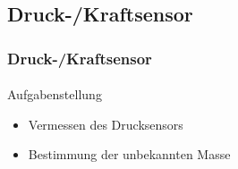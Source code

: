 \subsection{Druck-/Kraftsensor} %
\label{sub:Druck-/Kraftsensor}
\begin{frame}
    \frametitle{Druck-/Kraftsensor}
    \framesubtitle{}
            \begin{block}{Aufgabenstellung}
                 \begin{itemize}
                     \item Vermessen des Drucksensors
                     \item Bestimmung der unbekannten Masse
                 \end{itemize}
            \end{block}
\end{frame}
